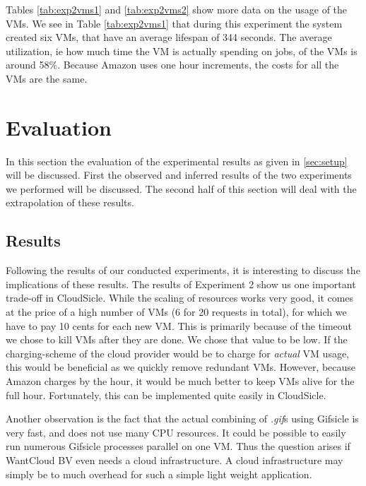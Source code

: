 \documentclass[twocolumn,twoside]{IEEEtran}
\begin{document}
Tables \ref{tab:exp2vms1} and \ref{tab:exp2vms2} show more data on the usage of the VMs. We see in Table \ref{tab:exp2vms1} that during this experiment the system created six VMs, that have an average lifespan of 344 seconds. The average utilization, ie how much time the VM is actually spending on jobs, of the VMs is around 58\%. Because Amazon uses one hour increments, the costs for all the VMs are the same.

\section{Evaluation}
\label{sec:eval}
In this section the evaluation of the experimental results as given in \autoref{sec:setup} will be discussed.
First the observed and inferred results of the two experiments we performed will be discussed.
The second half of this section will deal with the extrapolation of these results.

\subsection{Results}
Following the results of our conducted experiments, it is interesting to discuss the implications of these results. The results of Experiment 2 show us one important trade-off in CloudSicle. While the scaling of resources works very good, it comes at the price of a high number of VMs (6 for 20 requests in total), for which we have to pay 10 cents for each new VM. This is primarily because of the timeout we chose to kill VMs after they are done. We chose that value to be low. If the charging-scheme of the cloud provider would be to charge for \emph{actual} VM usage, this would be beneficial as we quickly remove redundant VMs. However, because Amazon charges by the hour, it would be much better to keep VMs alive for the full hour. Fortunately, this can be implemented quite easily in CloudSicle.

Another observation is the fact that the actual combining of  \emph{.gif}s using Gifsicle is very fast, and does not use many CPU resources. It could be possible to easily run numerous Gifsicle processes parallel on one VM. Thus the question arises if WantCloud BV even needs a cloud infrastructure. A cloud infrastructure may simply be to much overhead for such a simple light weight application.
\end{document}
